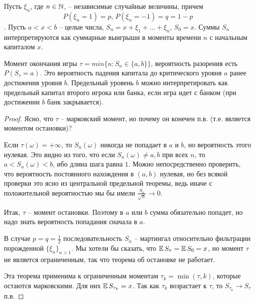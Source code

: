 Пусть $\xi_n$, где $n \in\mathbb{N}$, -- независимые случайные величины, причем
$$P(\xi_n = 1) = p \text{, } P(\xi_n = -1) = q = 1 - p$$.
Пусть $a < x < b$ -- целые числа, $S_n = x + \xi_1 + \ldots + \xi_n$, $S_0 = x$.
Суммы $S_n$ интерпретируются как суммарные выигрыши в моменты времени $n$ с начальным капиталом $x$.

Момент окончания игры $\tau = min\{n: S_n \in \{a, b\}\}$, вероятность
разорения есть $ P(S_{\tau} = a)$. Это вероятность падения капитала до критического уровня $a$ ранее достижения уровня $b$. 
Предельный уровень $b$
можно интерпретировать как предельный капитал второго игрока или
банка, если игра идет с банком (при достижении $b$ банк закрывается).

\begin{proof}
    Ясно, что $\tau$ -- марковский момент, но почему он конечен п.в. (т.е.
    является моментом остановки)? 
    
    Если $\tau(\omega) = +\infty$, то $S_n(\omega)$ никогда не попадает в $a$ и $b$, но вероятность этого нулевая. Это видно из того,
    что если $S_n(\omega) \neq a, b$ при всех $n$, то $a < S_n(\omega) < b$, ибо длина шага
    равна $1$. Можно непосредственно проверить, что вероятность постоянного нахождения в $(a, b)$ нулевая, но без всякой проверки это ясно
    из центральной предельной теоремы, ведь иначе с положительной вероятностью мы бы имели $\frac{S_n}{\sqrt{n}}\to 0$. 
    
    Итак, $\tau$ -- момент остановки.
    Поэтому в $a$ или $b$ сумма обязательно попадет, но надо знать вероятность попадания сначала в $a$.
    
    В случае $p = q = \frac{1}{2}$ последовательность $S_n$ -- мартингал относительно фильтрации порожденной 
    $\{\xi_n\}_{n>1}$. Мы хотели бы сказать,
    что $\operatorname{\mathbb{E}} S_{\tau} = \operatorname{\mathbb{E}} S_0 = x$, но момент $\tau$ не является ограниченным, так
    что теорема об остановке не работает. 
    
    Эта теорема применима к ограниченным моментам $\tau_k = \min (\tau, k)$, которые остаются марковскими. Для них $\operatorname{\mathbb{E}} S_{\tau_k} = x$. Так как $\tau_k$ возрастает к $\tau$, то $S_{\tau_k} \to S_{\tau}$ п.в.
    

\end{proof}
